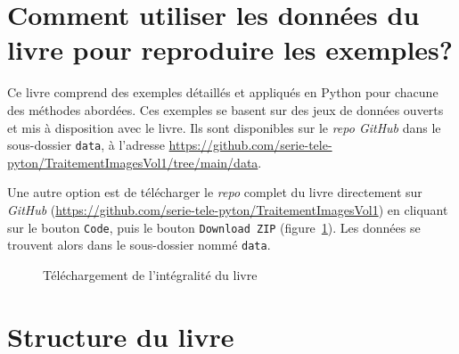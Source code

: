 \documentclass[
  11pt,
  letterpaper,
  open=any,
  twoside=false,
  french]{scrbook}
\begin{document}
\section*{Comment utiliser les données du livre pour reproduire les
exemples?}\label{sect003}


Ce livre comprend des exemples détaillés et appliqués en Python pour
chacune des méthodes abordées. Ces exemples se basent sur des jeux de
données ouverts et mis à disposition avec le livre. Ils sont disponibles
sur le \emph{repo GitHub} dans le sous-dossier \texttt{data}, à
l'adresse
\url{https://github.com/serie-tele-pyton/TraitementImagesVol1/tree/main/data}.

Une autre option est de télécharger le \emph{repo} complet du livre
directement sur \emph{GitHub}
(\url{https://github.com/serie-tele-pyton/TraitementImagesVol1}) en
cliquant sur le bouton \texttt{Code}, puis le bouton
\texttt{Download\ ZIP} (figure~\ref{fig-downloaffromgit}). Les données
se trouvent alors dans le sous-dossier nommé \texttt{data}.

\begin{figure}


\caption{\label{fig-downloaffromgit}Téléchargement de l'intégralité du
livre}

\end{figure}%

\section*{Structure du livre}\label{sect004}
\end{document}
